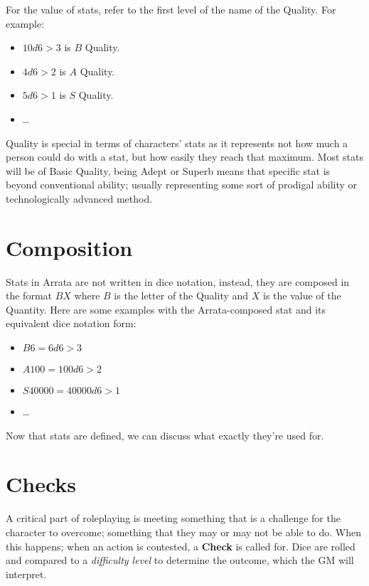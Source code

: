 \documentclass[../main.tex]{subfiles}
\begin{document}
    For the value of stats, refer to the first level of the name of the Quality. For example:

    \begin{itemize}
        \item $10d6>3$ is $B$ Quality.
        \item $4d6>2$ is $A$ Quality.
        \item $5d6>1$ is $S$ Quality.
        \item \dots
    \end{itemize}

    Quality is special in terms of characters' stats as it represents not how much a person could do with a stat, but how easily they reach that maximum. Most stats will be of Basic Quality, being Adept or Superb means that specific stat is beyond conventional ability; usually representing some sort of prodigal ability or technologically advanced method.

    \section{Composition}

    Stats in Arrata are not written in dice notation, instead, they are composed in the format $BX$ where $B$ is the letter of the Quality and $X$ is the value of the Quantity. Here are some examples with the Arrata-composed stat and its equivalent dice notation form:

    \begin{itemize}
        \item $B6 = 6d6>3$
        \item $A100 = 100d6>2$
        \item $S40000 = 40000d6>1$
        \item \dots
    \end{itemize}

    Now that stats are defined, we can discuss what exactly they're used for.

    \section{Checks}

    A critical part of roleplaying is meeting something that is a challenge for the character to overcome; something that they may or may not be able to do. When this happens; when an action is contested, a \textbf{Check} is called for. Dice are rolled and compared to a {\em difficulty level} to determine the outcome, which the GM will interpret.
\end{document}

